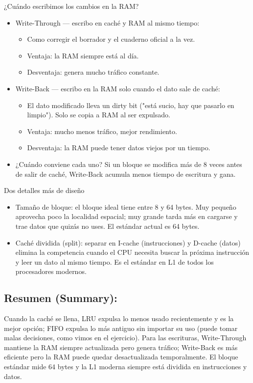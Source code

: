 \documentclass{article}
\begin{document}
\begin{frame}[label={sec:orgd5e7759}]{¿Cuándo escribimos los cambios en la RAM?}
\begin{itemize}
\item \alert{Write-Through} — escribo en caché y RAM al mismo tiempo:
\begin{itemize}
\item Como corregir el borrador y el cuaderno oficial a la vez.
\item Ventaja: la RAM siempre está al día.
\item Desventaja: genera mucho tráfico constante.
\end{itemize}

\item \alert{Write-Back} — escribo en la RAM solo cuando el dato sale de caché:
\begin{itemize}
\item El dato modificado lleva un \alert{dirty bit} ("está sucio, hay que
pasarlo en limpio"). Solo se copia a RAM al ser expulsado.
\item Ventaja: mucho menos tráfico, mejor rendimiento.
\item Desventaja: la RAM puede tener datos viejos por un tiempo.
\end{itemize}

\item \alert{¿Cuándo conviene cada uno?} Si un bloque se modifica más de 8 veces
antes de salir de caché, Write-Back acumula menos tiempo de
escritura y gana.
\end{itemize}
\end{frame}

\begin{frame}[label={sec:orgec897c1}]{Dos detalles más de diseño}
\begin{itemize}
\item \alert{Tamaño de bloque}: el bloque ideal tiene entre 8 y 64 bytes.
Muy pequeño aprovecha poco la localidad espacial; muy grande tarda
más en cargarse y trae datos que quizás no uses. El estándar
actual es \alert{64 bytes}.
\item \alert{Caché dividida (split)}: separar en I-cache (instrucciones) y
D-cache (datos) elimina la competencia cuando el CPU necesita
buscar la próxima instrucción y leer un dato al mismo tiempo.
Es el estándar en L1 de todos los procesadores modernos.
\end{itemize}
\end{frame}

\subsection{Resumen (Summary):}
\label{sec:org9e60fdf}
Cuando la caché se llena, LRU expulsa lo menos usado recientemente y
es la mejor opción; FIFO expulsa lo más antiguo sin importar su uso
(puede tomar malas decisiones, como vimos en el ejercicio). Para las
escrituras, Write-Through mantiene la RAM siempre actualizada pero
genera tráfico; Write-Back es más eficiente pero la RAM puede quedar
desactualizada temporalmente. El bloque estándar mide 64 bytes y la
L1 moderna siempre está dividida en instrucciones y datos.
\end{document}

